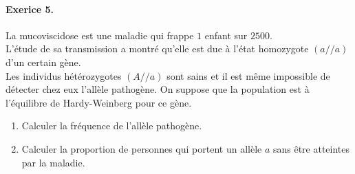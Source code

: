 \documentclass[11pt]{article}
\begin{document}
\paragraph{Exerice 5.}
La mucoviscidose est une maladie qui frappe $1$ enfant sur ${2500}$. \\
L’étude de sa transmission a montré qu’elle est due à l’état homozygote $(a//a)$ d’un certain gène.\\
Les individus hétérozygotes $(A//a)$ sont sains et il est même impossible de détecter chez eux l’allèle pathogène. On suppose que la population est à l’équilibre de Hardy-Weinberg pour ce gène.
\begin{enumerate}
	\item Calculer la fréquence de l’allèle pathogène.
	\item Calculer la proportion de personnes qui portent un allèle $a$ sans être atteintes par la maladie.
\end{enumerate}
\end{document}
